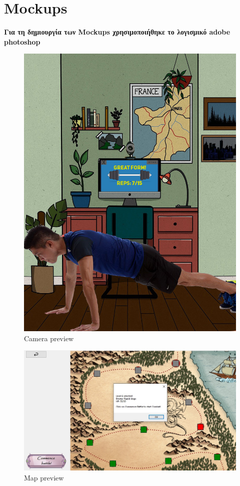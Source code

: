 \section{Mockups}
\textbf{ Για τη δημιουργία των Mockups χρησιμοποιήθηκε το λογισμικό adobe photoshop }
\begin{figure}[!htb]
  \centering
    \centering
    \includegraphics[width=\textwidth]{mockup1.jpg}
    \caption{Camera preview}
    \label{}
\end{figure}
\begin{figure}[!htb]
  \centering
    \centering
    \includegraphics[width=\textwidth]{mockup2.jpg}
    \caption{Map preview}
    \label{}
\end{figure}
